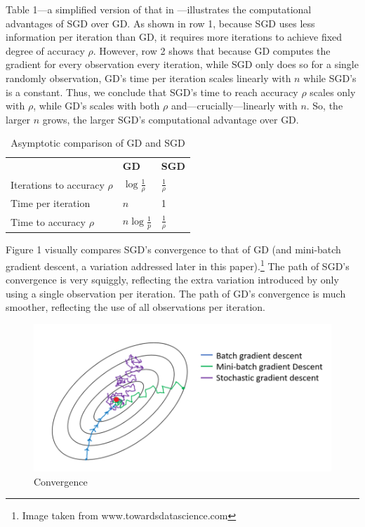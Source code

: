 \documentclass{article}
\begin{document}
Table 1---a simplified version of that in \cite{bottou2010large}---illustrates
the computational advantages of SGD over GD. As shown in row 1, because SGD uses
less information per iteration than GD, it requires more iterations to achieve
fixed degree of accuracy $\rho$.
However, row 2 shows that because GD computes the gradient for every observation every iteration,
while SGD only does so for a single randomly observation, GD's time per
iteration scales linearly with $n$ while SGD's is a constant. Thus, we conclude
that SGD's time to
reach accuracy $\rho$ scales only with $\rho$, while GD's scales with both
$\rho$ and---crucially---linearly with $n$. So, the larger $n$ grows, the larger
SGD's computational advantage over GD.

\begin{table}[h!]
	\centering
	\caption{Asymptotic comparison of GD and SGD}
	\begin{tabular}{|l l l|}
		\hline
		& \textbf{GD} & \textbf{SGD} \\
		Iterations to accuracy $\rho$ & $\log \frac{1}{\rho}$ & $\frac{1}{\rho}$ \\
		Time per iteration & $n$ & 1 \\
		Time to accuracy $\rho$ & $n \log \frac{1}{p}$ & $\frac{1}{\rho}$ \\
		\hline
	\end{tabular}
\end{table}

Figure 1 visually compares SGD's convergence to that of GD (and
mini-batch gradient descent, a variation addressed later in this
paper).\footnote{Image taken from www.towardsdatascience.com} The
path of SGD's convergence is very squiggly, reflecting the extra variation
introduced by only using a single observation per iteration. The path of GD's
convergence is much smoother, reflecting the use of all observations per
iteration.

\begin{figure}[h!]
	\centering
	\caption{Convergence}
\includegraphics[scale=0.3]{img}
\end{figure}
\end{document}
